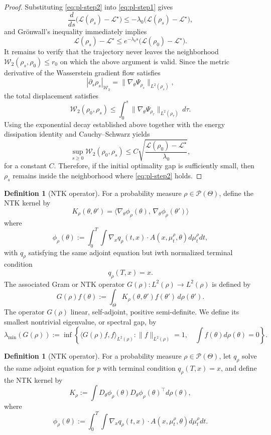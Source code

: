\documentclass[11pt,a4wide]{article}
\theoremstyle{definition}
\newtheorem{definition}[theorem]{Definition}
\newcommand{\Prob}{\mathcal{P}}
\newcommand{\Wass}{\mathcal{W}}
\begin{document}
\begin{proof}
Substituting \eqref{eq:pl-step2} into \eqref{eq:pl-step1} gives
\[
\frac{d}{ds}
\bigl(
\mathcal L(\rho_s)-\mathcal L^\star
\bigr)
\le
-
\lambda_0
\bigl(
\mathcal L(\rho_s)-\mathcal L^\star
\bigr),
\]
and Gr\"onwall's inequality immediately implies
\[
\mathcal L(\rho_s)-\mathcal L^\star
\le
e^{-\lambda_0 s}
\bigl(
\mathcal L(\rho_0)-\mathcal L^\star
\bigr).
\]
It remains to verify that the trajectory never leaves the neighborhood
$\Wass_2(\rho_s,\rho_0)\le r_0$ on which the above argument is valid.
Since the metric derivative of the Wasserstein gradient flow satisfies
\[
|\partial_s  \rho_s|_{\Wass_2}
=
\|
\nabla_\theta\Psi_{\rho_s}
\|_{L^2(\rho_s)},
\]
the total displacement satisfies
\[
\Wass_2(\rho_0,\rho_s)
\le
\int_0^s
\|
\nabla_\theta\Psi_{\rho_\tau}
\|_{L^2(\rho_\tau)}
\,d\tau.
\]
Using the exponential decay established above together with the energy
dissipation identity and Cauchy--Schwarz yields
\[
\sup_{s\ge0}
\Wass_2(\rho_0,\rho_s)
\le
C
\sqrt{
\frac{\mathcal L(\rho_0)-\mathcal L^\star}
{\lambda_0}
},
\]
for a  constant $C$. Therefore, if the initial optimality gap is
sufficiently small, then
$\rho_s$ remains inside the neighborhood where
\eqref{eq:pl-step2} holds.
\end{proof}
\begin{definition}[NTK operator]
For a probability measure $\rho\in\Prob(\Theta)$, define the NTK kernel by 
$$
K_\rho(\theta, \theta')= \big\langle \nabla_\theta \phi_\rho(\theta),\,\nabla_\theta\phi_\rho(\theta')\big\rangle
$$
where 
$$ 
\phi_\rho(\theta) := \int_0^T \int \nabla_x q_\rho(t, x)\cdot A(x, \mu_t^\rho, \theta)d\mu_t^\rho dt,
$$ 
with $q_\rho$ satisfying the same adjoint equation but iwth normalized terminal condition 
$$
q_\rho(T, x)=x. 
$$
The associated Gram or NTK operator   $G(\rho):L^2(\rho)\to L^2(\rho)$ is defined by  
\begin{equation}
G(\rho)f(\theta) := \int_\Theta K_\rho(\theta, \theta') f(\theta')\,d\rho(\theta').
\end{equation}
The operator $G(\rho)$ linear, self-adjoint, positive semi-definite. We define its smallest nontrivial eigenvalue, or spectral gap, by
 $$
 \lambda_{\min}(G(\rho)):= \inf\left\{\langle G(\rho)f,f\rangle_{L^2(\rho)} : \|f\|_{L^2(\rho)}=1, \quad \int f(\theta)d\rho(\theta)=0
\right \}.
 $$
\end{definition}
\fi 


\begin{definition}[NTK operator]
For a probability measure $\rho\in\Prob(\Theta)$, let $q_\rho$ solve the same 
adjoint equation for $p$ with terminal condition $q_\rho(T, x)=x$, 
and define the NTK kernel by 
$$
K_\rho:= \int D_\theta \phi_\rho(\theta)  D_\theta \phi_\rho(\theta)^\top  d\rho(\theta),
$$
where 
\begin{equation}\label{phir} 
\phi_\rho(\theta) := \int_0^T \int \nabla_x q_\rho(t, x)\cdot A(x, \mu_t^\rho, \theta)d\mu_t^\rho dt.
\end{equation} 
\end{definition}
\end{document}
